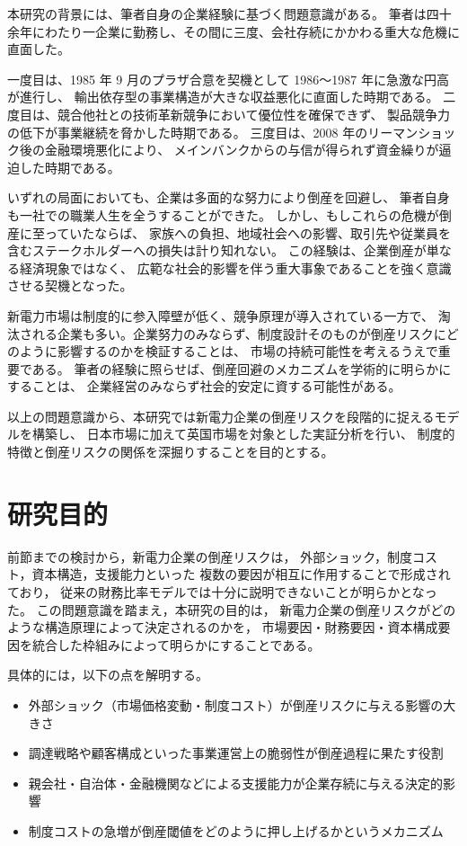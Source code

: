 本研究の背景には、筆者自身の企業経験に基づく問題意識がある。
筆者は四十余年にわたり一企業に勤務し、その間に三度、会社存続にかかわる重大な危機に直面した。

一度目は、1985 年 9 月のプラザ合意を契機として 1986～1987 年に急激な円高が進行し、
輸出依存型の事業構造が大きな収益悪化に直面した時期である。
二度目は、競合他社との技術革新競争において優位性を確保できず、
製品競争力の低下が事業継続を脅かした時期である。
三度目は、2008 年のリーマンショック後の金融環境悪化により、
メインバンクからの与信が得られず資金繰りが逼迫した時期である。

いずれの局面においても、企業は多面的な努力により倒産を回避し、
筆者自身も一社での職業人生を全うすることができた。
しかし、もしこれらの危機が倒産に至っていたならば、
家族への負担、地域社会への影響、取引先や従業員を含むステークホルダーへの損失は計り知れない。
この経験は、企業倒産が単なる経済現象ではなく、
広範な社会的影響を伴う重大事象であることを強く意識させる契機となった。

新電力市場は制度的に参入障壁が低く、競争原理が導入されている一方で、
淘汰される企業も多い。企業努力のみならず、制度設計そのものが倒産リスクにどのように影響するのかを検証することは、
市場の持続可能性を考えるうえで重要である。
筆者の経験に照らせば、倒産回避のメカニズムを学術的に明らかにすることは、
企業経営のみならず社会的安定に資する可能性がある。

以上の問題意識から、本研究では新電力企業の倒産リスクを段階的に捉えるモデルを構築し、
日本市場に加えて英国市場を対象とした実証分析を行い、
制度的特徴と倒産リスクの関係を深掘りすることを目的とする。




\section{研究目的}

前節までの検討から，新電力企業の倒産リスクは，
外部ショック，制度コスト，資本構造，支援能力といった
複数の要因が相互に作用することで形成されており，
従来の財務比率モデルでは十分に説明できないことが明らかとなった。
この問題意識を踏まえ，本研究の目的は，
新電力企業の倒産リスクがどのような構造原理によって決定されるのかを，
市場要因・財務要因・資本構成要因を統合した枠組みによって明らかにすることである。

具体的には，以下の点を解明する。

\begin{itemize}
    \item 外部ショック（市場価格変動・制度コスト）が倒産リスクに与える影響の大きさ
    \item 調達戦略や顧客構成といった事業運営上の脆弱性が倒産過程に果たす役割
    \item 親会社・自治体・金融機関などによる支援能力が企業存続に与える決定的影響
    \item 制度コストの急増が倒産閾値をどのように押し上げるかというメカニズム
\end{itemize}

